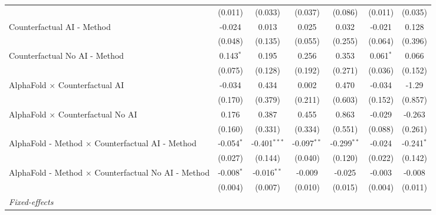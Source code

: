 \begin{tabular}{lcccccc}
                                                              & (0.011)       & (0.033)        & (0.037)       & (0.086)       & (0.011)       & (0.035)\\   
   Counterfactual AI - Method                                 & -0.024        & 0.013          & 0.025         & 0.032         & -0.021        & 0.128\\   
                                                              & (0.048)       & (0.135)        & (0.055)       & (0.255)       & (0.064)       & (0.396)\\   
   Counterfactual No AI - Method                              & 0.143$^{*}$   & 0.195          & 0.256         & 0.353         & 0.061$^{*}$   & 0.066\\   
                                                              & (0.075)       & (0.128)        & (0.192)       & (0.271)       & (0.036)       & (0.152)\\   
   AlphaFold $\times$ Counterfactual AI                       & -0.034        & 0.434          & 0.002         & 0.470         & -0.034        & -1.29\\   
                                                              & (0.170)       & (0.379)        & (0.211)       & (0.603)       & (0.152)       & (0.857)\\   
   AlphaFold $\times$ Counterfactual No AI                    & 0.176         & 0.387          & 0.455         & 0.863         & -0.029        & -0.263\\   
                                                              & (0.160)       & (0.331)        & (0.334)       & (0.551)       & (0.088)       & (0.261)\\   
   AlphaFold - Method $\times$ Counterfactual AI - Method     & -0.054$^{*}$  & -0.401$^{***}$ & -0.097$^{**}$ & -0.299$^{**}$ & -0.024        & -0.241$^{*}$\\   
                                                              & (0.027)       & (0.144)        & (0.040)       & (0.120)       & (0.022)       & (0.142)\\   
   AlphaFold - Method $\times$ Counterfactual No AI - Method  & -0.008$^{*}$  & -0.016$^{**}$  & -0.009        & -0.025        & -0.003        & -0.008\\   
                                                              & (0.004)       & (0.007)        & (0.010)       & (0.015)       & (0.004)       & (0.011)\\   
   \midrule
   \emph{Fixed-effects}\\

\end{tabular}
